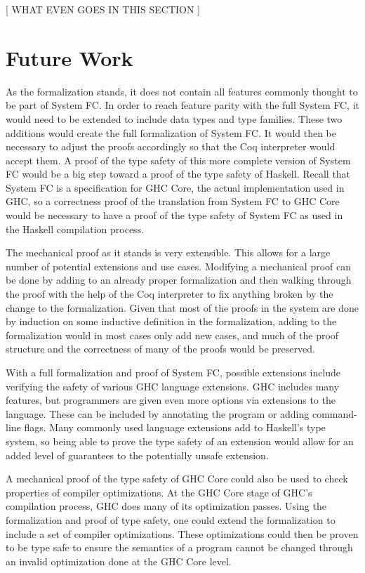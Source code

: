 \documentclass{sig-alternate}
\begin{document}
[ WHAT EVEN GOES IN THIS SECTION ]

\section{Future Work}
\label{sec:future-work}

As the formalization stands, it does not contain all features commonly thought to be part of System FC. In order to reach feature parity with the full System FC, it would need to be extended to include data types and type families. These two additions would create the full formalization of System FC. It would then be necessary to adjust the proofs accordingly so that the Coq interpreter would accept them. A proof of the type safety of this more complete version of System FC would be a big step toward a proof of the type safety of Haskell. Recall that System FC is a specification for GHC Core, the actual implementation used in GHC, so a correctness proof of the translation from System FC to GHC Core would be necessary to have a proof of the type safety of System FC as used in the Haskell compilation process.

The mechanical proof as it stands is very extensible. This allows for a large number of potential extensions and use cases. Modifying a mechanical proof can be done by adding to an already proper formalization and then walking through the proof with the help of the Coq interpreter to fix anything broken by the change to the formalization. Given that most of the proofs in the system are done by induction on some inductive definition in the formalization, adding to the formalization would in most cases only add new cases, and much of the proof structure and the correctness of many of the proofs would be preserved.

With a full formalization and proof of System FC, possible extensions include verifying the safety of various GHC language extensions. GHC includes many features, but programmers are given even more options via extensions to the language. These can be included by annotating the program or adding command-line flags. Many commonly used language extensions add to Haskell's type system, so being able to prove the type safety of an extension would allow for an added level of guarantees to the potentially unsafe extension.

A mechanical proof of the type safety of GHC Core could also be used to check properties of compiler optimizations. At the GHC Core stage of GHC's compilation process, GHC does many of its optimization passes. Using the formalization and proof of type safety, one could extend the formalization to include a set of compiler optimizations. These optimizations could then be proven to be type safe to ensure the semantics of a program cannot be changed through an invalid optimization done at the GHC Core level.
\end{document}
